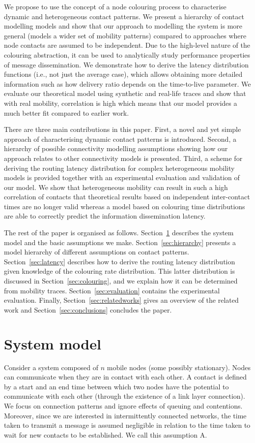 \documentclass{article}
\begin{document}
We propose to use the concept of a node colouring process to
characterise dynamic and heterogeneous contact patterns. We present a
hierarchy of contact modelling models and show that our approach to
modelling the system is more general (models a wider set of mobility
patterns) compared to approaches where node contacts are assumed to be
independent. Due to the high-level nature of the colouring
abstraction, it can be used to analytically study performance
properties of message dissemination. We demonstrate how to derive the
latency distribution functions (i.e., not just the average case),
which allows obtaining more detailed information such as how delivery
ratio depends on the time-to-live parameter. We evaluate our
theoretical model using synthetic and real-life traces and show that
with real mobility, correlation is high which means that our model
provides a much better fit compared to earlier work.

There are three main contributions in this paper. First, a novel and
yet simple approach of characterising dynamic contact patterns is
introduced. Second, a hierarchy of possible connectivity modelling
assumptions showing how our approach relates to other connectivity
models is presented. Third, a scheme for deriving the routing latency
distribution for complex heterogeneous mobility models is provided
together with an experimental evaluation and validation of our
model. We show that heterogeneous mobility can result in such a high
correlation of contacts that theoretical results based on independent
inter-contact times are no longer valid whereas a model based on
colouring time distributions are able to correctly predict the
information dissemination latency.


The rest of the paper is organised as
follows. Section~\ref{sec:systemmodel} describes the system model and
the basic assumptions we make. Section~\ref{sec:hierarchy} presents a
model hierarchy of different assumptions on contact
patterns. Section~\ref{sec:latency} describes how to derive the
routing latency distribution given knowledge of the colouring rate
distribution. This latter distribution is discussed in
Section~\ref{sec:colouring}, and we explain how it can be determined
from mobility traces. Section~\ref{sec:evaluation} contains the
experimental evaluation. Finally, Section~\ref{sec:relatedworks} gives
an overview of the related work and Section~\ref{sec:conclusions}
concludes the paper.


\section{System model}
\label{sec:systemmodel}
Consider a system composed of $n$ mobile nodes (some possibly
stationary). Nodes can communicate when they are in contact with each
other. A contact is defined by a start and an end time between which
two nodes have the potential to communicate with each other (through
the existence of a link layer connection). We focus on connection
patterns and ignore effects of queuing and contentions. Moreover,
since we are interested in intermittently connected networks, the time
taken to transmit a message is assumed negligible in relation to the
time taken to wait for new contacts to be established. We call this
assumption A.
\end{document}
